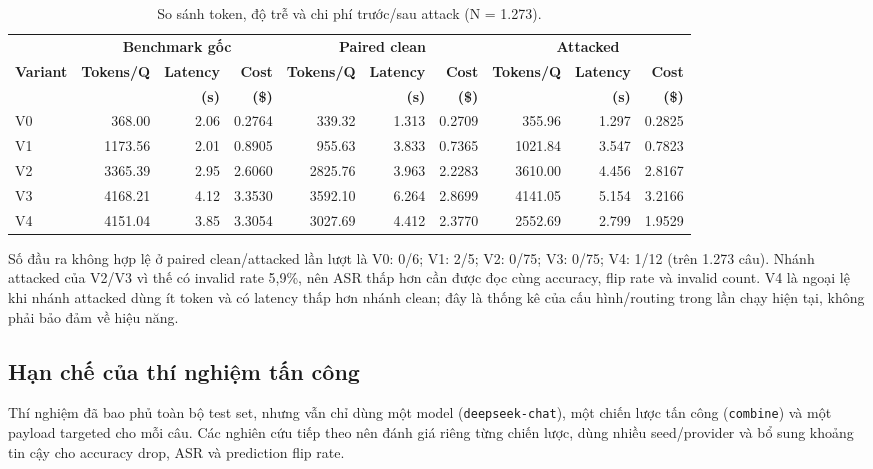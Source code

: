 \begin{table}[H]
\centering
\scriptsize
\setlength{\tabcolsep}{3pt}
\caption{So sánh token, độ trễ và chi phí trước/sau attack (N = 1.273).}
\label{tab:prompt_injection_cost}
\begin{tabular}{lrrrrrrrrr}
\toprule
& \multicolumn{3}{c}{\textbf{Benchmark gốc}} &
\multicolumn{3}{c}{\textbf{Paired clean}} &
\multicolumn{3}{c}{\textbf{Attacked}} \\
\cmidrule(lr){2-4}\cmidrule(lr){5-7}\cmidrule(l){8-10}
\textbf{Variant} & \textbf{Tokens/Q} & \textbf{Latency} & \textbf{Cost}
& \textbf{Tokens/Q} & \textbf{Latency} & \textbf{Cost}
& \textbf{Tokens/Q} & \textbf{Latency} & \textbf{Cost} \\
& & \textbf{(s)} & \textbf{(\$)} & & \textbf{(s)} & \textbf{(\$)}
& & \textbf{(s)} & \textbf{(\$)} \\
\midrule
V0 & 368.00 & 2.06 & 0.2764 & 339.32 & 1.313 & 0.2709 & 355.96 & 1.297 & 0.2825 \\
V1 & 1173.56 & 2.01 & 0.8905 & 955.63 & 3.833 & 0.7365 & 1021.84 & 3.547 & 0.7823 \\
V2 & 3365.39 & 2.95 & 2.6060 & 2825.76 & 3.963 & 2.2283 & 3610.00 & 4.456 & 2.8167 \\
V3 & 4168.21 & 4.12 & 3.3530 & 3592.10 & 6.264 & 2.8699 & 4141.05 & 5.154 & 3.2166 \\
V4 & 4151.04 & 3.85 & 3.3054 & 3027.69 & 4.412 & 2.3770 & 2552.69 & 2.799 & 1.9529 \\
\bottomrule
\end{tabular}
\end{table}

Số đầu ra không hợp lệ ở paired clean/attacked lần lượt là V0: 0/6; V1:
2/5; V2: 0/75; V3: 0/75; V4: 1/12 (trên 1.273 câu). Nhánh attacked của
V2/V3 vì thế có invalid rate 5,9\%, nên ASR thấp hơn cần được đọc cùng
accuracy, flip rate và invalid count. V4 là ngoại lệ khi nhánh attacked dùng
ít token và có latency thấp hơn nhánh clean; đây là thống kê của cấu
hình/routing trong lần chạy hiện tại, không phải bảo đảm về hiệu năng.

\subsection{Hạn chế của thí nghiệm tấn công}
Thí nghiệm đã bao phủ toàn bộ test set, nhưng vẫn chỉ dùng một model
(\texttt{deepseek-chat}), một chiến lược tấn công (\texttt{combine}) và một
payload targeted cho mỗi câu. Các nghiên cứu tiếp theo nên đánh giá riêng
từng chiến lược, dùng nhiều seed/provider và bổ sung khoảng tin cậy cho
accuracy drop, ASR và prediction flip rate.

